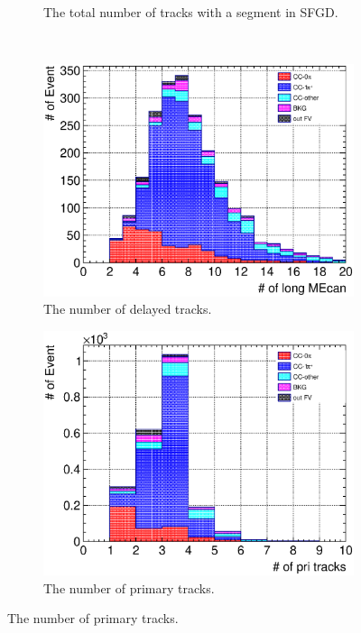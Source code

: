 \begin{figure}
\begin{subfigure}{\dbfigwid\textwidth}
       \caption{The total number of tracks with a segment in SFGD.}
       \label{subfig:tlpi-trknum-sfgd-sfgmu}
  \end{subfigure}
  \\
  \begin{subfigure}{\dbfigwid\textwidth}
       \includegraphics[width=\textwidth]{figures/sel/SFGmu_nsdptrk_stack_al8.eps}
       \caption{The number of delayed tracks.}
       \label{subfig:tlpi-trknum-delayed-sfgmu}
  \end{subfigure}
  \begin{subfigure}{\dbfigwid\textwidth}
       \includegraphics[width=\textwidth]{figures/sel/SFGmu_npri_stack_al8.eps}
       \caption{The number of primary tracks.}

\end{subfigure}
\end{figure}
